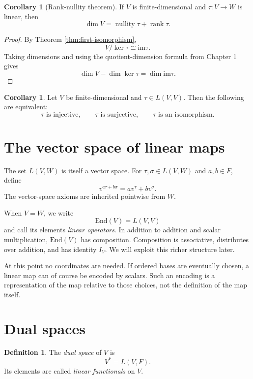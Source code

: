 \documentclass{amsbook}
\theoremstyle{definition}
\newtheorem{definition}[theorem]{Definition}
\newtheorem{corollary}[theorem]{Corollary}
\theoremstyle{remark}
\newcommand{\im}{\mathrm{im}}
\newcommand{\End}{\mathrm{End}}
\numberwithin{section}{chapter}
\numberwithin{equation}{chapter}
\begin{document}
\begin{corollary}[Rank-nullity theorem]\label{cor:rank-nullity}
If $V$ is finite-dimensional and $\tau\colon V\to W$ is linear, then
\[
\dim V=\operatorname{nullity}\tau+\operatorname{rank}\tau.
\]
\end{corollary}

\begin{proof}
By Theorem \ref{thm:first-isomorphism},
\[
V/\ker\tau\cong\im\tau.
\]
Taking dimensions and using the quotient-dimension formula from Chapter 1 gives
\[
\dim V-\dim\ker\tau=\dim\im\tau.
\]
\end{proof}

\begin{corollary}\label{cor:endomorphism-injective-surjective}
Let $V$ be finite-dimensional and $\tau\in L(V,V)$. Then the following are equivalent:
\[
\tau\text{ is injective},\qquad
\tau\text{ is surjective},\qquad
\tau\text{ is an isomorphism}.
\]
\end{corollary}

\section{The vector space of linear maps}

The set $L(V,W)$ is itself a vector space. For $\tau,\sigma\in L(V,W)$ and $a,b\in F$, define
\[
v^{a\tau+b\sigma}=av^\tau+bv^\sigma.
\]
The vector-space axioms are inherited pointwise from $W$.

When $V=W$, we write
\[
\End(V)=L(V,V)
\]
and call its elements \emph{linear operators}. In addition to addition and scalar multiplication, $\End(V)$ has composition. Composition is associative, distributes over addition, and has identity $I_V$. We will exploit this richer structure later.

At this point no coordinates are needed. If ordered bases are eventually chosen, a linear map can of course be encoded by scalars. Such an encoding is a representation of the map relative to those choices, not the definition of the map itself.

\section{Dual spaces}

\begin{definition}
The \emph{dual space} of $V$ is
\[
V^*=L(V,F).
\]
Its elements are called \emph{linear functionals} on $V$.
\end{definition}
\end{document}
